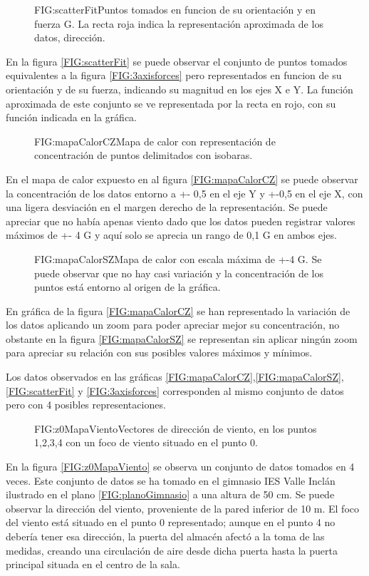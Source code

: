 \begin{figure}[Puntos de medida]{FIG:scatterFit}{Puntos tomados en funcion de su orientación y en fuerza G. La recta roja indica la representación aproximada de los datos, dirección.}
\end{figure}
En la figura \ref{FIG:scatterFit} se puede observar el conjunto de puntos tomados equivalentes a la figura \ref{FIG:3axisforces} pero representados en funcion de su orientación y de su fuerza, indicando su magnitud en los ejes X e Y. La función aproximada de este conjunto se ve representada por la recta en rojo, con su función indicada en la gráfica.


\begin{figure}[Mapa de calor con zoom]{FIG:mapaCalorCZ}{Mapa de calor con representación de concentración de puntos delimitados con isobaras.}
\end{figure}
En el mapa de calor expuesto en al figura \ref{FIG:mapaCalorCZ} se puede observar la concentración de los datos entorno a +- 0,5 en el eje Y y +-0,5 en el eje X, con una ligera desviación en el margen derecho de la representación. Se puede apreciar que no había apenas viento dado que los datos pueden registrar valores máximos de +- 4 G y aquí solo se aprecia un rango de 0,1 G en ambos ejes.


\begin{figure}[Mapa de calor sin zoom]{FIG:mapaCalorSZ}{Mapa de calor con escala máxima de +-4 G. Se puede observar que no hay casi variación y la concentración de los puntos está entorno al origen de la gráfica.}
\end{figure}

En gráfica de la figura \ref{FIG:mapaCalorCZ} se han representado la variación de los datos aplicando un zoom para poder apreciar mejor su concentración, no obstante en la figura \ref{FIG:mapaCalorSZ} se representan sin aplicar ningún zoom para apreciar su relación con sus posibles valores máximos y mínimos.

Los datos observados en las gráficas \ref{FIG:mapaCalorCZ},\ref{FIG:mapaCalorSZ},\ref{FIG:scatterFit} y \ref{FIG:3axisforces} corresponden al mismo conjunto de datos pero con 4 posibles representaciones.


\begin{figure}[Mapa viento 2D - Z0]{FIG:z0MapaViento}{Vectores de dirección de viento, en los puntos 1,2,3,4 con un foco de viento situado en el punto 0.}
\end{figure}
En la figura \ref{FIG:z0MapaViento} se observa un conjunto de datos tomados en 4 veces. Este conjunto de datos se ha tomado en el gimnasio IES Valle Inclán ilustrado en el plano \ref{FIG:planoGimnasio} a una altura de 50 cm. Se puede observar la dirección del viento, proveniente de la pared inferior de 10 m. El foco del viento está situado en el punto 0 representado; aunque en el punto 4 no debería tener esa dirección, la puerta del almacén afectó a la toma de las medidas, creando una circulación de aire desde dicha puerta hasta la puerta principal situada en el centro de la sala.

